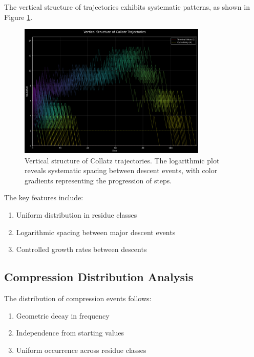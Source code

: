 \begin{theorem}\label{thm:vertical}
The vertical structure of trajectories exhibits systematic patterns, as shown in Figure \ref{fig:vertical_structure}.

\begin{figure}[h]
\centering
\includegraphics[width=0.8\textwidth]{figures/vertical_structure.svg}
\caption{Vertical structure of Collatz trajectories. The logarithmic plot reveals systematic spacing between descent events, with color gradients representing the progression of steps.}
\label{fig:vertical_structure}
\end{figure}

The key features include:
\begin{enumerate}
\item Uniform distribution in residue classes
\item Logarithmic spacing between major descent events
\item Controlled growth rates between descents
\end{enumerate}
\end{theorem}

\subsection{Compression Distribution Analysis}

\begin{theorem}\label{thm:compression_dist}
The distribution of compression events follows:
\begin{enumerate}
\item Geometric decay in frequency
\item Independence from starting values
\item Uniform occurrence across residue classes
\end{enumerate}
\end{theorem}

